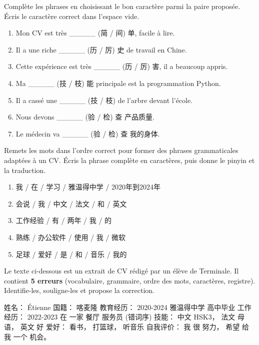 \documentclass[11pt]{article}
\begin{document}
\begin{exercice}
Complète les phrases en choisissant le bon caractère parmi la paire proposée. Écris le caractère correct dans l'espace vide.
\begin{enumerate}
    \item Mon CV est très \_\_\_\_\_ (简 / 间) 单, facile à lire.
    \item Il a une riche \_\_\_\_\_ (历 / 厉) 史 de travail en Chine.
    \item Cette expérience est très \_\_\_\_\_ (历 / 厉) 害, il a beaucoup appris.
    \item Ma \_\_\_\_\_ (技 / 枝) 能 principale est la programmation Python.
    \item Il a cassé une \_\_\_\_\_ (技 / 枝) de l'arbre devant l'école.
    \item Nous devons \_\_\_\_\_ (验 / 检) 查 产品质量.
    \item Le médecin va \_\_\_\_\_ (验 / 检) 查 我的身体.
\end{enumerate}
\end{exercice}

\begin{exercice}
Remets les mots dans l'ordre correct pour former des phrases grammaticales adaptées à un CV. Écris la phrase complète en caractères, puis donne le pinyin et la traduction.
\begin{enumerate}
    \item 我 / 在 / 学习 / 雅温得中学 / 2020年到2024年
    \item 会说 / 我 / 中文 / 法文 / 和 / 英文
    \item 工作经验 / 有 / 两年 / 我 / 的
    \item 熟练 / 办公软件 / 使用 / 我 / 微软
    \item 足球 / 爱好 / 是 / 和 / 音乐 / 我的
\end{enumerate}
\end{exercice}

\begin{exercice}
Le texte ci-dessous est un extrait de CV rédigé par un élève de Terminale. Il contient \textbf{5 erreurs} (vocabulaire, grammaire, ordre des mots, caractères, registre). Identifie-les, souligne-les et propose la correction.
\begin{textebox}
姓名： Étienne
国籍： 喀麦隆
教育经历：
2020-2024 雅温得中学 高中毕业
工作经历：
2022-2023 在 一家 餐厅 服务员 (错词序)
技能：
中文 HSK3， 法文 母语， 英文 好
爱好： 看书， 打篮球， 听音乐
自我评价： 我 很 努力， 希望 给 我 一个 机会。
\end{textebox}
\end{exercice}
\end{document}
